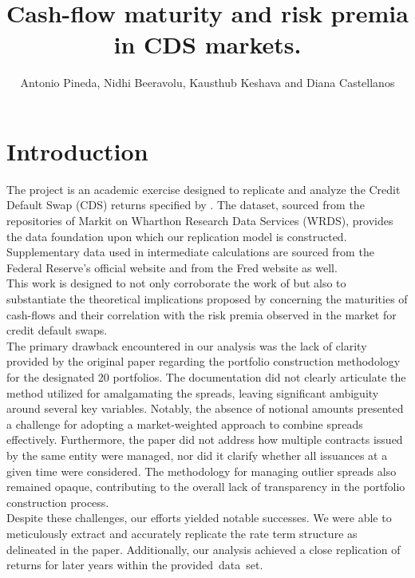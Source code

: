 \documentclass{article}
\title{Cash-flow maturity and risk premia in CDS markets.}
\author{Antonio Pineda, Nidhi Beeravolu, Kausthub Keshava and Diana Castellanos}
\begin{document}
\maketitle

\section{Introduction}

The project is an academic exercise designed to replicate and analyze the Credit Default Swap (CDS) returns specified by \cite{kelly2017}. The dataset, sourced from the repositories of Markit on Wharthon Research Data Services (WRDS), provides the data foundation upon which our replication model is constructed. Supplementary data used in intermediate calculations are sourced from the Federal Reserve's official website and from the Fred website as well. \\

This work is designed to not only corroborate the work of \cite{kelly2017} but also to substantiate the theoretical implications proposed by \cite{Palhares2013} concerning the maturities of cash-flows and their correlation with the risk premia observed in the market for credit default swaps.\\

The primary drawback encountered in our analysis was the lack of clarity provided by the original paper regarding the portfolio construction methodology for the designated 20 portfolios. The documentation did not clearly articulate the method utilized for amalgamating the spreads, leaving significant ambiguity around several key variables. Notably, the absence of notional amounts presented a challenge for adopting a market-weighted approach to combine spreads effectively. Furthermore, the paper did not address how multiple contracts issued by the same entity were managed, nor did it clarify whether all issuances at a given time were considered. The methodology for managing outlier spreads also remained opaque, contributing to the overall lack of transparency in the portfolio construction process.\\

Despite these challenges, our efforts yielded notable successes. We were able to meticulously extract and accurately replicate the rate term structure as delineated in the paper. Additionally, our analysis achieved a close replication of returns for later years within the provided data set.\\
\end{document}
